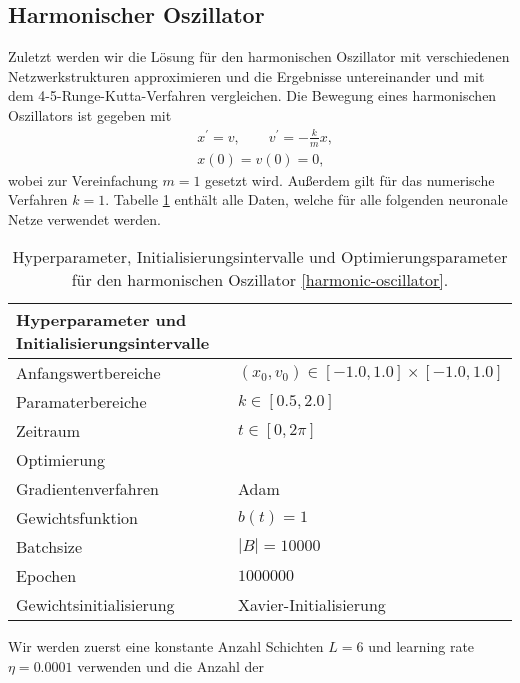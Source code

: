 \subsection{Harmonischer Oszillator}
\label{sec:harmonischer-oszillator}
Zuletzt werden wir die Lösung für den harmonischen Oszillator mit verschiedenen Netzwerkstrukturen approximieren und
die Ergebnisse untereinander und mit dem 4-5-Runge-Kutta-Verfahren vergleichen. Die Bewegung eines harmonischen
Oszillators ist gegeben mit
\begin{align}
       \label{harmonic-oscillator}
       &x^{\prime}=v, \qquad v^{\prime}=-\frac{k}{m}x, \\
       &x(0)=v(0)=0, \nonumber
\end{align}
wobei zur Vereinfachung $m=1$ gesetzt wird. Außerdem gilt für das numerische Verfahren $k=1$. Tabelle
\ref{stiff-table-data} enthält alle Daten, welche für alle folgenden neuronale Netze verwendet werden.
\begin{table}
       \renewcommand{\arraystretch}{1.0}
       \centering
       \begin{tabular}{ l | l }
              \hline
              Hyperparameter und Initialisierungsintervalle & \\
              \hline
              Anfangswertbereiche &
              $(x_{0},v_0) \in [-1.0, 1.0] \times [-1.0, 1.0]$ \\
              Paramaterbereiche & $k \in [0.5, 2.0]$ \\
              Zeitraum & $t \in [0, 2\pi]$ \\
              \hline
              Optimierung & \\
              \hline
              Gradientenverfahren & Adam \\
              Gewichtsfunktion & $b(t)=1$ \\
              Batchsize & $|B|=10000$ \\
              Epochen & $1000000$ \\
              Gewichtsinitialisierung & Xavier-Initialisierung \\
              \hline
       \end{tabular}
       \caption{Hyperparameter, Initialisierungsintervalle und Optimierungsparameter für den harmonischen Oszillator
       \eqref{harmonic-oscillator}.}
       \label{stiff-table-data}
\end{table}
Wir werden zuerst eine konstante Anzahl Schichten $L=6$ und learning rate $\eta=0.0001$ verwenden und die Anzahl der
